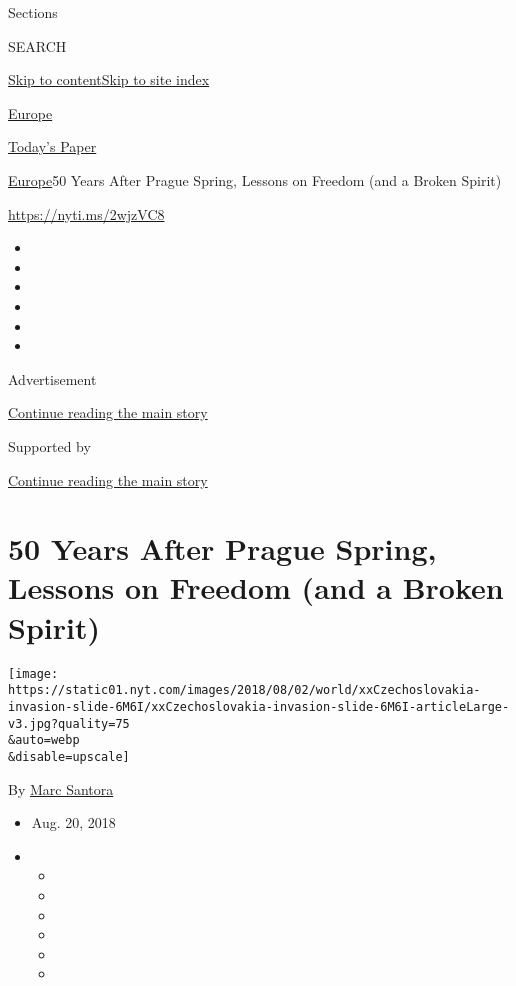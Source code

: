 Sections

SEARCH

\protect\hyperlink{site-content}{Skip to
content}\protect\hyperlink{site-index}{Skip to site index}

\href{https://www.nytimes.com/section/world/europe}{Europe}

\href{https://myaccount.nytimes.com/auth/login?response_type=cookie\&client_id=vi}{}

\href{https://www.nytimes.com/section/todayspaper}{Today's Paper}

\href{/section/world/europe}{Europe}\textbar{}50 Years After Prague
Spring, Lessons on Freedom (and a Broken Spirit)

\url{https://nyti.ms/2wjzVC8}

\begin{itemize}
\item
\item
\item
\item
\item
\item
\end{itemize}

Advertisement

\protect\hyperlink{after-top}{Continue reading the main story}

Supported by

\protect\hyperlink{after-sponsor}{Continue reading the main story}

\hypertarget{50-years-after-prague-spring-lessons-on-freedom-and-a-broken-spirit}{%
\section{50 Years After Prague Spring, Lessons on Freedom (and a Broken
Spirit)}\label{50-years-after-prague-spring-lessons-on-freedom-and-a-broken-spirit}}

\texttt{[image: https://static01.nyt.com/images/2018/08/02/world/xxCzechoslovakia-invasion-slide-6M6I/xxCzechoslovakia-invasion-slide-6M6I-articleLarge-v3.jpg?quality=75\\\&auto=webp\\\&disable=upscale]}

By \href{https://www.nytimes.com/by/marc-santora}{Marc Santora}

\begin{itemize}
\item
  Aug. 20, 2018
\item
  \begin{itemize}
  \item
  \item
  \item
  \item
  \item
  \item
  \end{itemize}
\end{itemize}

